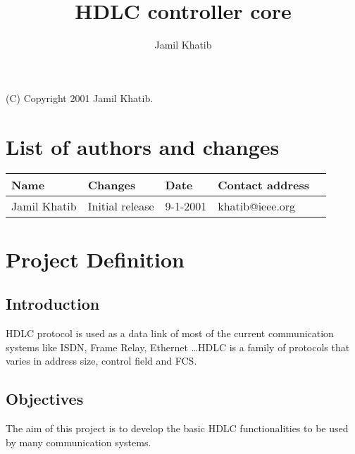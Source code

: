 \documentclass[a4paper,11pt]{article}
\author{Jamil Khatib}
\title{HDLC controller core}
\newcommand{\addauthor}[4]{#1 & #2 & #3 & #4 \\ \hline}
\begin{document}
\maketitle

\begin{center}(C) Copyright 2001 Jamil Khatib.\end{center}

\thispagestyle{empty}

\newpage


\tableofcontents

\newpage

\section{List of authors and changes}

\begin{tabular}{|l|l|l|l|l|}
\hline
Name & Changes & Date & Contact address\\
\hline
\hline 

\addauthor{Jamil Khatib}{Initial release}{9-1-2001}{khatib@ieee.org}


\end{tabular}

\newpage

\section{Project Definition}

\subsection{Introduction}
HDLC protocol is used as a data link of most of the current communication systems like ISDN, Frame Relay, Ethernet \dots HDLC is a family of protocols that varies in address size, control field and FCS.


\subsection{Objectives}
The aim of this project is to develop the basic HDLC functionalities to be used by many communication systems.
\end{document}
